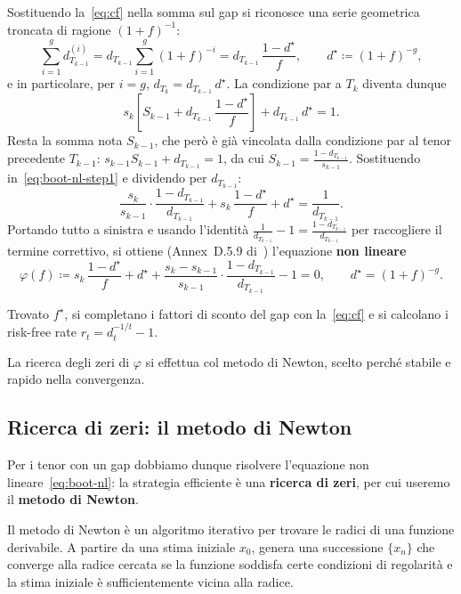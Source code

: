 \documentclass[11pt,a4paper]{article}
\theoremstyle{plain}
\theoremstyle{definition}
\theoremstyle{remark}
\newcommand{\defeq}{\coloneqq}
\begin{document}
Sostituendo la~\eqref{eq:cf} nella somma sul gap si riconosce una serie geometrica troncata di
ragione $(1+f)^{-1}$:
\[
  \sum_{i=1}^{g} d^{(i)}_{T_{k-1}}
  = d_{T_{k-1}} \sum_{i=1}^{g} (1+f)^{-i}
  = d_{T_{k-1}}\,\frac{1-d^\star}{f},
  \qquad d^\star \defeq (1+f)^{-g},
\]
e in particolare, per $i=g$, $d_{T_k}=d_{T_{k-1}}\,d^\star$. La condizione par a $T_k$
diventa dunque
\begin{equation}
  \label{eq:boot-nl-step1}
  s_k\left[S_{k-1} + d_{T_{k-1}}\,\frac{1-d^\star}{f}\right] + d_{T_{k-1}}\,d^\star = 1.
\end{equation}
Resta la somma nota $S_{k-1}$, che per\`o \`e gi\`a vincolata dalla condizione par al tenor
precedente $T_{k-1}$: $s_{k-1}S_{k-1}+d_{T_{k-1}}=1$, da cui
$S_{k-1}=\frac{1-d_{T_{k-1}}}{s_{k-1}}$. Sostituendo in~\eqref{eq:boot-nl-step1} e dividendo
per $d_{T_{k-1}}$:
\[
  \frac{s_k}{s_{k-1}}\cdot\frac{1-d_{T_{k-1}}}{d_{T_{k-1}}}
  + s_k\,\frac{1-d^\star}{f} + d^\star = \frac{1}{d_{T_{k-1}}}.
\]
Portando tutto a sinistra e usando l'identit\`a
$\frac{1}{d_{T_{k-1}}}-1=\frac{1-d_{T_{k-1}}}{d_{T_{k-1}}}$ per raccogliere il termine
correttivo, si ottiene (Annex~D.5.9 di~\cite{eiopa2026}) l'equazione \textbf{non lineare}
\begin{equation}
  \label{eq:boot-nl}
  \varphi(f) \defeq s_{k}\,\frac{1 - d^\star}{f}
            + d^\star
            + \frac{s_{k} - s_{k-1}}{s_{k-1}}\cdot\frac{1 - d_{T_{k-1}}}{d_{T_{k-1}}}
            - 1 = 0,
  \qquad d^\star = (1+f)^{-g}.
\end{equation}

Trovato $f^\star$, si completano i fattori di sconto del gap con la~\eqref{eq:cf} e si calcolano
i risk-free rate $r_t=d_t^{-1/t}-1$.

La ricerca degli zeri di $\varphi$ si effettua col metodo di Newton, scelto perch\'e stabile
e rapido nella convergenza.
\subsection{Ricerca di zeri: il metodo di Newton}
\label{sec:zeri}

Per i tenor con un gap dobbiamo dunque risolvere l'equazione non lineare~\eqref{eq:boot-nl}: la
strategia efficiente \`e una \textbf{ricerca di zeri}, per cui useremo il \textbf{metodo di
Newton}.

Il metodo di Newton \`e un algoritmo iterativo per trovare le radici di una funzione derivabile. A
partire da una stima iniziale $x_0$, genera una successione $\{x_n\}$ che converge alla radice
cercata se la funzione soddisfa certe condizioni di regolarit\`a e la stima iniziale \`e
sufficientemente vicina alla radice.
\end{document}
